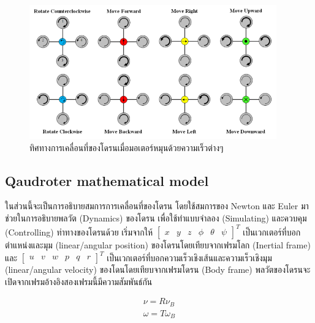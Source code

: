 \documentclass{classes/fiboReport}
\begin{document}
\begin{figure}[ht]
	\centering
	\includegraphics[width=0.95\textwidth]{images/Quadcopter_Movement.png}
	\caption{ทิศทางการเคลื่อนที่ของโดรนเมื่อมอเตอร์หมุนด้วยความเร็วต่างๆ}
	\label{fig:quadroter_movement}
\end{figure}




\clearpage
\subsection{Qaudroter mathematical model}
ในส่วนนี้จะเป็นการอธิบายสมการการเคลื่อนที่ของโดรน โดยใช้สมการของ Newton และ Euler มาช่วยในการอธิบายพลวัต (Dynamics) ของโดรน
เพื่อใช้ทำแบบจำลอง (Simulating) และควบคุม (Controlling) ท่าทางของโดรนด้วย
เริ่มจากให้ $[\begin{matrix}x & y & z & \phi & \theta & \psi \end{matrix}]^T$ เป็นเวกเตอร์ที่บอกตำแหน่งและมุม (linear/angular position)
ของโดรนโดยเทียบจากเฟรมโลก (Inertial frame) และ $[\begin{matrix}u & v & w & p & q & r\end{matrix}]^T$ เป็นเวกเตอร์ที่บอกความเร็วเชิงเส้นและความเร็วเชิงมุม
(linear/angular velocity) ของโดนโดยเทียบจากเฟรมโดรน (Body frame) พลวัตของโดรนจะเปิดจากเฟรมอ้างอิงสองเฟรมนี้มีความสัมพันธ์กัน

\begin{equation}
	\begin{array}{c}
		{\nu = R\nu_{B}}               \\
		{\omega = T\omega_{B}}         
		\label{equ:equation_of_motion} 
	\end{array}
\end{equation}
\end{document}
